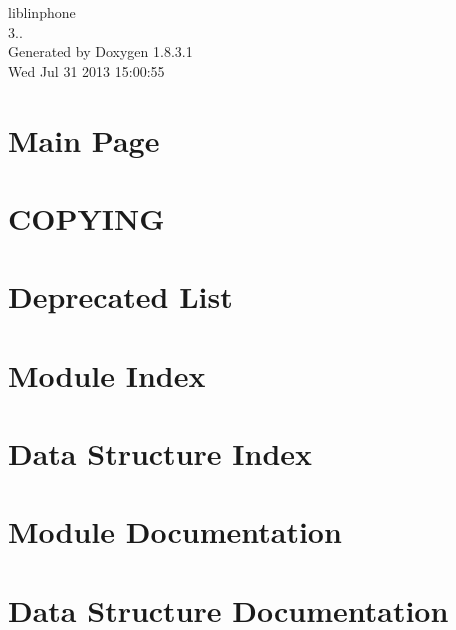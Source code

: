 \documentclass{book}
\begin{document}
\begin{titlepage}
\vspace*{7cm}
\begin{center}
{\Large liblinphone \\[1ex]\large 3.. }\\
\vspace*{1cm}
{\large Generated by Doxygen 1.8.3.1}\\
\vspace*{0.5cm}
{\small Wed Jul 31 2013 15:00:55}\\
\end{center}
\end{titlepage}
\clearemptydoublepage
{}
\tableofcontents
\clearemptydoublepage
{}
\chapter{Main Page}
\label{index}
\chapter{C\-O\-P\-Y\-I\-N\-G}
\label{liblinphone_license}

\chapter{Deprecated List}
\label{deprecated}

\chapter{Module Index}

\chapter{Data Structure Index}

\chapter{Module Documentation}























\chapter{Data Structure Documentation}






\printindex
\end{document}
